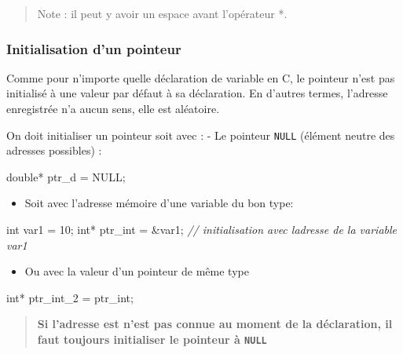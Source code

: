 \documentclass[11pt]{article}
\providecommand{\tightlist}{%
      \setlength{\itemsep}{0pt}\setlength{\parskip}{0pt}}
\newenvironment{Shaded}{}{}
\newcommand{\DataTypeTok}[1]{\textcolor[rgb]{0.56,0.13,0.00}{{#1}}}
\newcommand{\DecValTok}[1]{\textcolor[rgb]{0.25,0.63,0.44}{{#1}}}
\newcommand{\CommentTok}[1]{\textcolor[rgb]{0.38,0.63,0.69}{\textit{{#1}}}}
\newcommand{\NormalTok}[1]{{#1}}
\begin{document}
\begin{quote}
Note : il peut y avoir un espace avant l'opérateur *.
\end{quote}

    \hypertarget{initialisation-dun-pointeur}{%
\subsubsection{Initialisation d'un
pointeur}\label{initialisation-dun-pointeur}}

Comme pour n'importe quelle déclaration de variable en C, le pointeur
n'est pas initialisé à une valeur par défaut à sa déclaration. En
d'autres termes, l'adresse enregistrée n'a aucun sens, elle est
aléatoire.

On doit initialiser un pointeur soit avec : - Le pointeur \texttt{NULL}
(élément neutre des adresses possibles) :

\begin{Shaded}
\begin{Highlighting}[]
    \DataTypeTok{double}\NormalTok{* ptr\_d = NULL;}
\end{Highlighting}
\end{Shaded}

\begin{itemize}
\tightlist
\item
  Soit avec l'adresse mémoire d'une variable du bon type:
\end{itemize}

\begin{Shaded}
\begin{Highlighting}[]
    \DataTypeTok{int}\NormalTok{ var1 = }\DecValTok{10}\NormalTok{;}
    \DataTypeTok{int}\NormalTok{* ptr\_int = \&var1; }\CommentTok{// initialisation avec l\textquotesingle{}adresse de la variable var1}
\end{Highlighting}
\end{Shaded}

\begin{itemize}
\tightlist
\item
  Ou avec la valeur d'un pointeur de même type
\end{itemize}

\begin{Shaded}
\begin{Highlighting}[]
    \DataTypeTok{int}\NormalTok{* ptr\_int\_2 = ptr\_int; }
\end{Highlighting}
\end{Shaded}

\begin{quote}
\textbf{Si l'adresse est n'est pas connue au moment de la déclaration,
il faut toujours initialiser le pointeur à \texttt{NULL}}
\end{quote}
\end{document}
